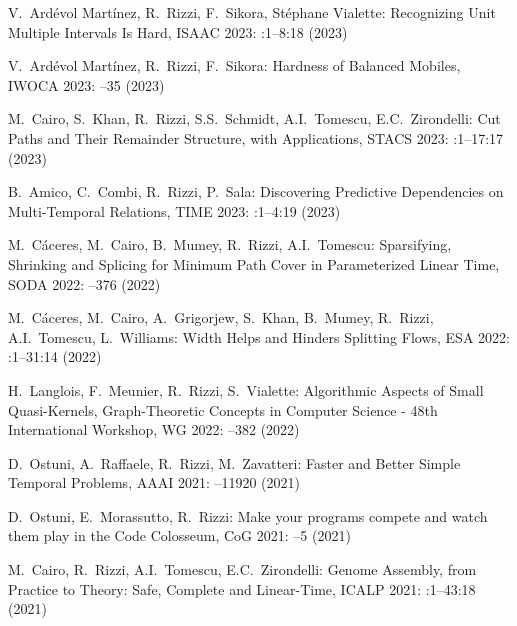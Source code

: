 
\begin{etaremune}
\item {\sc V.~Ardévol Martínez, R.~Rizzi, F.~Sikora, Stéphane Vialette:}
   \newblock Recognizing Unit Multiple Intervals Is Hard,
   \newblock  ISAAC 2023:
   :1--8:18 (2023)

\item {\sc V.~Ardévol Martínez, R.~Rizzi, F.~Sikora:}
   \newblock Hardness of Balanced Mobiles,
   \newblock  IWOCA 2023:
   --35 (2023)

\item {\sc M.~Cairo, S.~Khan, R.~Rizzi, S.S.~Schmidt, A.I.~Tomescu, E.C.~Zirondelli:}
   \newblock Cut Paths and Their Remainder Structure, with Applications,
   \newblock  STACS 2023:
   :1--17:17 (2023)

\item {\sc B.~Amico, C.~Combi, R.~Rizzi, P.~Sala:}
   \newblock Discovering Predictive Dependencies on Multi-Temporal Relations,
   \newblock  TIME 2023:
   :1--4:19 (2023)

\item {\sc M.~Cáceres, M.~Cairo, B.~Mumey, R.~Rizzi, A.I.~Tomescu:}
   \newblock Sparsifying, Shrinking and Splicing for Minimum Path Cover in Parameterized Linear Time,
   \newblock SODA 2022:
   --376 (2022)

\item {\sc M.~Cáceres, M.~Cairo, A.~Grigorjew, S.~Khan, B.~Mumey, R.~Rizzi, A.I.~Tomescu, L.~Williams:}
   \newblock Width Helps and Hinders Splitting Flows,
   \newblock ESA 2022:
   :1--31:14 (2022)

  \item {\sc H.~Langlois, F.~Meunier, R.~Rizzi, S.~Vialette:}
   \newblock Algorithmic Aspects of Small Quasi-Kernels,
   \newblock Graph-Theoretic Concepts in Computer Science - 48th International Workshop, WG 2022:
   --382 (2022)

\item {\sc D.~Ostuni, A.~Raffaele, R.~Rizzi, M.~Zavatteri:}
   \newblock Faster and Better Simple Temporal Problems,
   \newblock AAAI 2021:
   --11920 (2021)
   
\item {\sc D.~Ostuni, E.~Morassutto, R.~Rizzi:}
   \newblock Make your programs compete and watch them play in the Code Colosseum,
   \newblock CoG 2021:
   --5 (2021)
   
\item {\sc M.~Cairo, R.~Rizzi, A.I.~Tomescu, E.C.~Zirondelli:}
   \newblock Genome Assembly, from Practice to Theory: Safe, Complete and Linear-Time,
   \newblock ICALP 2021:
   :1--43:18 (2021)
   

\end{etaremune}
